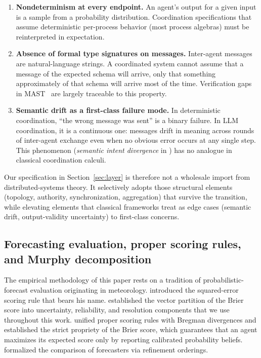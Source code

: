 \documentclass[11pt]{article}
\begin{document}
\begin{enumerate}
\item \textbf{Nondeterminism at every endpoint.} An agent's output for a given input is a sample from a probability distribution. Coordination specifications that assume deterministic per-process behavior (most process algebras) must be reinterpreted in expectation.
\item \textbf{Absence of formal type signatures on messages.} Inter-agent messages are natural-language strings. A coordinated system cannot assume that a message of the expected schema will arrive, only that something approximately of that schema will arrive most of the time. Verification gaps in MAST~\citep{cemri2025mast} are largely traceable to this property.
\item \textbf{Semantic drift as a first-class failure mode.} In deterministic coordination, ``the wrong message was sent'' is a binary failure. In LLM coordination, it is a continuous one: messages drift in meaning across rounds of inter-agent exchange even when no obvious error occurs at any single step. This phenomenon (\emph{semantic intent divergence} in \citet{sid2026}) has no analogue in classical coordination calculi.
\end{enumerate}

Our specification in Section~\ref{sec:layer} is therefore not a wholesale import from distributed-systems theory. It selectively adopts those structural elements (topology, authority, synchronization, aggregation) that survive the transition, while elevating elements that classical frameworks treat as edge cases (semantic drift, output-validity uncertainty) to first-class concerns.

\subsection{Forecasting evaluation, proper scoring rules, and Murphy decomposition}
\label{sec:related-forecasting}

The empirical methodology of this paper rests on a tradition of probabilistic-forecast evaluation originating in meteorology. \citet{brier1950verification} introduced the squared-error scoring rule that bears his name. \citet{murphy1973decomposition} established the vector partition of the Brier score into uncertainty, reliability, and resolution components that we use throughout this work. \citet{gneiting2007strictly} unified proper scoring rules with Bregman divergences and established the strict propriety of the Brier score, which guarantees that an agent maximizes its expected score only by reporting calibrated probability beliefs. \citet{degroot1983comparison} formalized the comparison of forecasters via refinement orderings.
\end{document}
